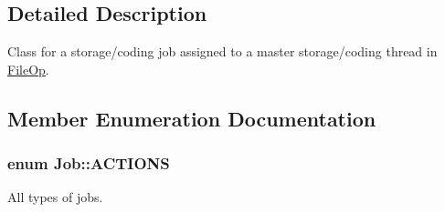 \subsection{\-Detailed \-Description}
\-Class for a storage/coding job assigned to a master storage/coding thread in \hyperlink{classFileOp}{\-File\-Op}. 



\subsection{\-Member \-Enumeration \-Documentation}
\hypertarget{classJob_a639625a71786e5ebaee5697a4fdb6dd0}{
\subsubsection[{\-A\-C\-T\-I\-O\-N\-S}]{\setlength{\rightskip}{0pt plus 5cm}enum {\bf \-Job\-::\-A\-C\-T\-I\-O\-N\-S}}}\label{classJob_a639625a71786e5ebaee5697a4fdb6dd0}


\-All types of jobs. 

